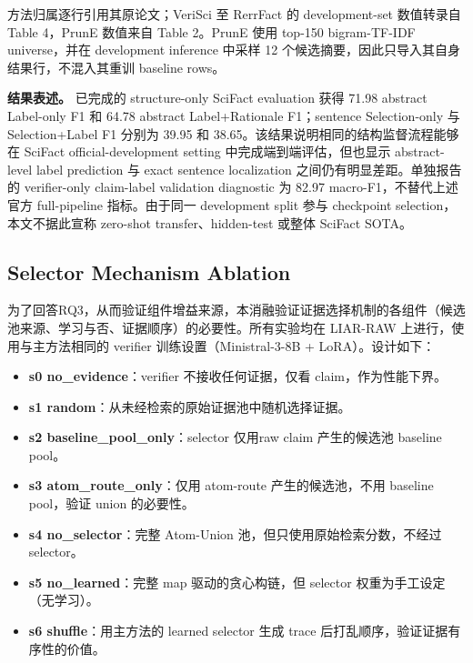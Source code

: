 \documentclass[letterpaper]{article}
\begin{document}
方法归属逐行引用其原论文；VeriSci 至 RerrFact 的 development-set 数值转录自 \citet{Rana2022RerrFact} Table 4，PrunE 数值来自 \citet{Fang2025PrunE} Table 2。PrunE 使用 top-150 bigram-TF-IDF universe，并在 development inference 中采样 12 个候选摘要，因此只导入其自身结果行，不混入其重训 baseline rows。

\textbf{结果表述。} 已完成的 structure-only SciFact evaluation 获得 71.98 abstract Label-only F1 和 64.78 abstract Label+Rationale F1；sentence Selection-only 与 Selection+Label F1 分别为 39.95 和 38.65。该结果说明相同的结构监督流程能够在 SciFact official-development setting 中完成端到端评估，但也显示 abstract-level label prediction 与 exact sentence localization 之间仍有明显差距。单独报告的 verifier-only claim-label validation diagnostic 为 82.97 macro-F1，不替代上述官方 full-pipeline 指标。由于同一 development split 参与 checkpoint selection，本文不据此宣称 zero-shot transfer、hidden-test 或整体 SciFact SOTA。

\FloatBarrier
\subsection{Selector Mechanism Ablation}

为了回答RQ3，从而验证组件增益来源，本消融验证证据选择机制的各组件（候选池来源、学习与否、证据顺序）的必要性。所有实验均在 LIAR-RAW 上进行，使用与主方法相同的 verifier 训练设置（Ministral-3-8B + LoRA）。设计如下：

\begin{itemize}
\item \textbf{s0 no\_evidence}：verifier 不接收任何证据，仅看 claim，作为性能下界。
\item \textbf{s1 random}：从未经检索的原始证据池中随机选择证据。
\item \textbf{s2 baseline\_pool\_only}：selector 仅用raw claim 产生的候选池 baseline pool。
\item \textbf{s3 atom\_route\_only}：仅用 atom-route 产生的候选池，不用 baseline pool，验证 union 的必要性。
\item \textbf{s4 no\_selector}：完整 Atom-Union 池，但只使用原始检索分数，不经过selector。
\item \textbf{s5 no\_learned}：完整 map 驱动的贪心构链，但 selector 权重为手工设定（无学习）。
\item \textbf{s6 shuffle}：用主方法的 learned selector 生成 trace 后打乱顺序，验证证据有序性的价值。
\end{itemize}
\end{document}
